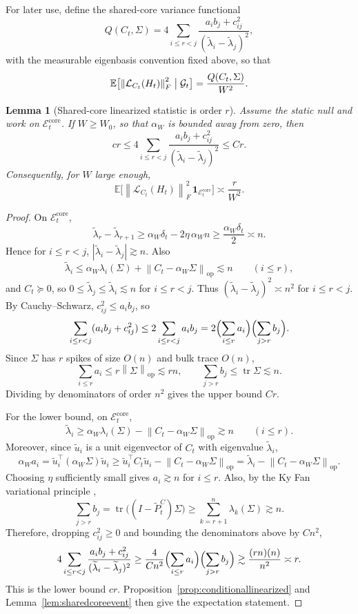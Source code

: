 \documentclass[11pt]{article}
\theoremstyle{tightplain}
\newtheorem{lemma}[theorem]{Lemma}
\theoremstyle{tightdef}
\DeclareMathOperator{\tr}{tr}
\DeclareMathOperator{\op}{op}
\newcommand{\E}{\mathbb E}
\newcommand{\norm}[1]{\left\lVert #1 \right\rVert}
\newcommand{\abs}[1]{\left\lvert #1 \right\rvert}
\newcommand{\one}{\mathbf 1}
\begin{document}
For later use, define the shared-core variance functional
\[
Q(C_t,\Sigma)
=
4\sum_{i\le r<j}
\frac{a_i b_j+c_{ij}^2}{(\widetilde\lambda_i-\widetilde\lambda_j)^2},
\]
with the measurable eigenbasis convention fixed above, so that
\[
\E\bigl[\norm{\mathcal L_{C_t}(H_t)}_F^2\bigm|\mathcal G_t\bigr]
=
\frac{Q(C_t,\Sigma)}{W^2}.
\]

\begin{lemma}[Shared-core linearized statistic is order $r$]\label{lem:sharedcorelinearized}
Assume the static null and work on $\mathcal E_t^{\mathrm{core}}$. If
$W\ge W_0$, so that $\alpha_W$ is bounded away from zero, then
\[
c r
\le
4\sum_{i\le r<j}
\frac{a_i b_j+c_{ij}^2}{(\widetilde\lambda_i-\widetilde\lambda_j)^2}
\le
C r.
\]
Consequently, for $W$ large enough,
\[
\E\bigl[
\norm{\mathcal L_{C_t}(H_t)}_F^2
\,\one_{\mathcal E_t^{\mathrm{core}}}
\bigr]
\asymp
\frac r{W^2}.
\]
\end{lemma}

\begin{proof}
On $\mathcal E_t^{\mathrm{core}}$,
\[
\widetilde\lambda_r-\widetilde\lambda_{r+1}
\ge
\alpha_W\delta_t-2\eta\,\alpha_W n
\ge
\frac{\alpha_W\delta_t}{2}
\asymp n.
\]
Hence for $i\le r<j$, $\abs{\widetilde\lambda_i-\widetilde\lambda_j}\gtrsim n$.
Also
\[
\widetilde\lambda_i
\le
\alpha_W\lambda_i(\Sigma)+\norm{C_t-\alpha_W\Sigma}_{\op}
\lesssim n
\qquad
(i\le r),
\]
and $C_t\succeq0$, so $0\le\widetilde\lambda_j\le\widetilde\lambda_i\lesssim n$
for $i\le r<j$. Thus
$(\widetilde\lambda_i-\widetilde\lambda_j)^2\asymp n^2$ for $i\le r<j$. By
Cauchy--Schwarz, $c_{ij}^2\le a_i b_j$, so
\[
\sum_{i\le r<j}(a_i b_j+c_{ij}^2)
\le
2\sum_{i\le r<j}a_i b_j
=2\Bigl(\sum_{i\le r}a_i\Bigr)\Bigl(\sum_{j>r}b_j\Bigr).
\]
Since $\Sigma$ has $r$ spikes of size $O(n)$ and bulk trace $O(n)$,
\[
\sum_{i\le r}a_i\le r\norm{\Sigma}_{\op}\lesssim rn,
\qquad
\sum_{j>r}b_j\le \tr\Sigma\lesssim n.
\]
Dividing by denominators of order $n^2$ gives the upper bound $Cr$.

For the lower bound, on $\mathcal E_t^{\mathrm{core}}$,
\[
\widetilde\lambda_i
\ge
\alpha_W\lambda_i(\Sigma)-\norm{C_t-\alpha_W\Sigma}_{\op}
\gtrsim n
\qquad
(i\le r).
\]
Moreover, since $\widetilde u_i$ is a unit eigenvector of $C_t$ with eigenvalue
$\widetilde\lambda_i$,
\[
\alpha_W a_i
=\widetilde u_i^\top(\alpha_W\Sigma)\widetilde u_i
\ge
\widetilde u_i^\top C_t\widetilde u_i-\norm{C_t-\alpha_W\Sigma}_{\op}
=\widetilde\lambda_i-\norm{C_t-\alpha_W\Sigma}_{\op}.
\]
Choosing $\eta$ sufficiently small gives $a_i\gtrsim n$ for $i\le r$. Also, by
the Ky Fan variational principle \cite[Ch.~III]{Bhatia1997},
\[
\sum_{j>r}b_j
=\tr\bigl((I-\widetilde P_t^C)\Sigma\bigr)
\ge
\sum_{k=r+1}^n\lambda_k(\Sigma)
\gtrsim n.
\]
Therefore, dropping $c_{ij}^2\ge0$ and bounding the denominators above by
$Cn^2$,
\[
4\sum_{i\le r<j}\frac{a_i b_j+c_{ij}^2}{(\widetilde\lambda_i-\widetilde\lambda_j)^2}
\ge
\frac{4}{Cn^2}\Bigl(\sum_{i\le r}a_i\Bigr)\Bigl(\sum_{j>r}b_j\Bigr)
\gtrsim
\frac{(rn)(n)}{n^2}
\asymp r.
\]
This is the lower bound $cr$. Proposition~\ref{prop:conditionallinearized} and
Lemma~\ref{lem:sharedcoreevent} then give the expectation statement.
\end{proof}
\end{document}
